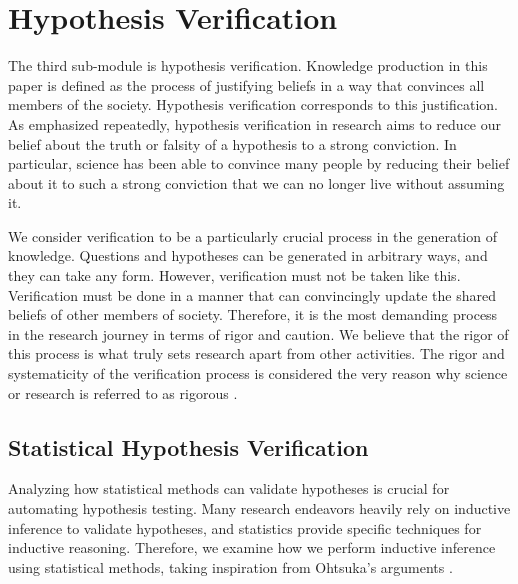 \documentclass{book}
\begin{document}


\section{Hypothesis Verification}
The third sub-module is hypothesis verification. Knowledge production in this paper is defined as the process of justifying beliefs in a way that convinces all members of the society. Hypothesis verification corresponds to this justification. As emphasized repeatedly, hypothesis verification in research aims to reduce our belief about the truth or falsity of a hypothesis to a strong conviction. In particular, science has been able to convince many people by reducing their belief about it to such a strong conviction that we can no longer live without assuming it.

We consider verification to be a particularly crucial process in the generation of knowledge. Questions and hypotheses can be generated in arbitrary ways, and they can take any form. However, verification must not be taken like this. Verification must be done in a manner that can convincingly update the shared beliefs of other members of society. Therefore, it is the most demanding process in the research journey in terms of rigor and caution. We believe that the rigor of this process is what truly sets research apart from other activities. The rigor and systematicity of the verification process is considered the very reason why science or research is referred to as rigorous \cite{sep-scientific-method,hoyningen2008systematicity,haack2003defending}.

\subsection{Statistical Hypothesis Verification}
Analyzing how statistical methods can validate hypotheses is crucial for automating hypothesis testing. Many research endeavors heavily rely on inductive inference to validate hypotheses, and statistics provide specific techniques for inductive reasoning. Therefore, we examine how we perform inductive inference using statistical methods, taking inspiration from Ohtsuka's arguments \cite{otsuka2022thinking}.
\end{document}
